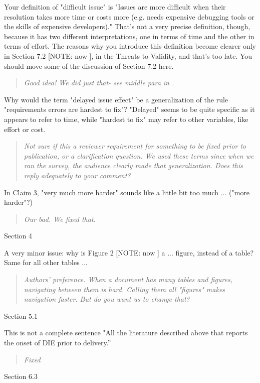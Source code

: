  
Your definition of "difficult issue" is "Issues are more
difficult when their resolution takes more time or costs
more (e.g. needs expensive debugging tools or the skills of
expensive developers)." That's not a very precise
definition, though, because it has two different
interpretations, one in terms of time and the other in terms
of effort. The reasons why you introduce this definition
become clearer only in Section 7.2 [NOTE: now ], in the Threats to
Validity, and that's too late. You should move some of the
discussion of Section 7.2 here.
\begin{quote}
{\em Good idea! We did just that- see middle para in .}
\end{quote}
Why would the term "delayed issue effect" be a
generalization of the rule "requirements errors are hardest
to fix"? "Delayed" seems to be quite specific as it appears
to refer to time, while "hardest to fix" may refer to other
variables, like effort or cost.
\begin{quote}
{\em Not sure if this a reviewer requirement for something to be fixed
prior to publication, or a clarification question. We used these
terms since when we ran the survey, the audience clearly made
that generalization. Does this reply adequately to your comment?}
\end{quote}
In Claim 3, "very much more harder" sounds like a
little bit too much ... ("more harder"?)
\begin{quote}
{\em Our bad. We fixed that.}
\end{quote}
Section 4

A very minor issue: why is Figure 2 [NOTE: now ] a ... figure, instead of
a table? Same for all other tables ...
\begin{quote}
{\em Authors' preference. When a document has many tables and figures, navigating
between them is hard. Calling them all "figures" makes navigation faster. 
But do you want us to change that?}
\end{quote}
Section 5.1

This is not a complete sentence "All the literature
described above that reports the onset of DIE prior to delivery.''

\begin{quote}
{\em Fixed}
\end{quote}

Section 6.3

